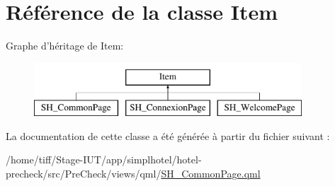 \hypertarget{classItem}{\section{Référence de la classe Item}
\label{classItem}
}
Graphe d'héritage de Item\-:\begin{figure}[H]
\begin{center}
\leavevmode
\includegraphics[height=2.000000cm]{classItem}
\end{center}
\end{figure}


La documentation de cette classe a été générée à partir du fichier suivant \-:\begin{DoxyCompactItemize}
\item 
/home/tiff/\-Stage-\/\-I\-U\-T/app/simplhotel/hotel-\/precheck/src/\-Pre\-Check/views/qml/\hyperlink{SH__CommonPage_8qml}{S\-H\-\_\-\-Common\-Page.\-qml}\end{DoxyCompactItemize}
